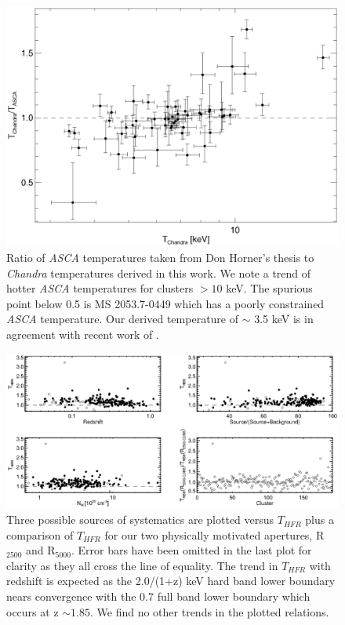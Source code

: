 \documentclass{emulateapj}
\newcommand{\tf}{T_{HFR} }
\begin{document}
{\clearpage
\begin{figure}[htp]
\begin{center}
\includegraphics[scale=1.0]{asch}
\caption{\small Ratio of {\textit{ASCA}} temperatures taken from Don
Horner's thesis to {\textit{Chandra}} temperatures derived in this
work. We note a trend of hotter {\textit{ASCA}} temperatures for
clusters $> 10$ keV. The spurious point below 0.5 is MS
2053.7-0449 which has a poorly constrained {\textit{ASCA}}
temperature. Our derived temperature of $\sim$ 3.5 keV is in agreement
with recent work of \cite{2007astro.ph..3156M}.}
\label{fig:asch}
\end{center}
\end{figure}

\clearpage
\begin{figure}[htp]
\begin{center}
\includegraphics[scale=1.0]{sys}
\caption{\small Three possible sources of systematics are
plotted versus $\tf$ plus a comparison of $\tf$ for our two
physically motivated apertures, R$_{2500}$ and R$_{5000}$. Error bars
have been omitted in the last plot for clarity as they all cross the
line of equality. The trend in $\tf$ with redshift is expected as the
2.0/(1+z) keV hard band lower boundary nears convergence with the 0.7
full band lower boundary which occurs at z $\sim 1.85$. We find no
other trends in the plotted relations.}
\label{fig:sys}
\end{center}
\end{figure}

}
\end{document}
